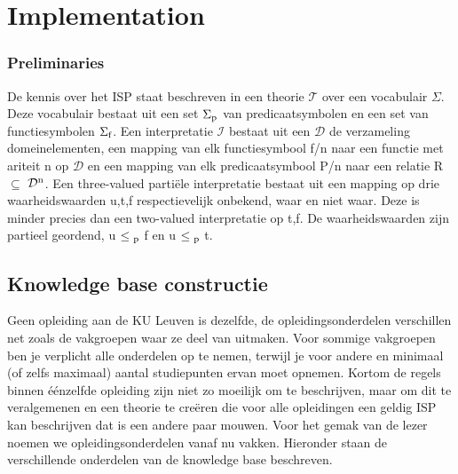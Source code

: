 \chapter{Implementation}
\label{cha:implementation}

\subsection{Preliminaries}
De kennis over het ISP staat beschreven in een theorie $\mathcal{T}$ over een vocabulair $\Sigma$. Deze vocabulair bestaat uit een set $\Sigma\textsubscript{p}$ van predicaatsymbolen en een set van functiesymbolen $\Sigma\textsubscript{f}$. Een interpretatie $\mathcal{I}$ bestaat uit een $\mathcal{D}$ de verzameling domeinelementen, een mapping van elk functiesymbool f/n naar een functie met ariteit n op $\mathcal{D}$ en een mapping van elk predicaatsymbool P/n naar een relatie R $\subseteq$ $\mathcal{D}\textsuperscript{n}$. Een three-valued parti\"{e}le interpretatie bestaat uit een mapping op drie waarheidswaarden {u,t,f} respectievelijk onbekend, waar en niet waar. Deze is minder precies dan een two-valued interpretatie op {t,f}. 
De waarheidswaarden zijn partieel geordend, u $\leq\textsubscript{p}$ f en u $\leq\textsubscript{p}$ t.

\section{Knowledge base constructie}
Geen opleiding aan de KU Leuven is dezelfde, de opleidingsonderdelen verschillen net zoals de vakgroepen waar ze deel van uitmaken. Voor sommige vakgroepen ben je verplicht alle onderdelen op te nemen, terwijl je voor andere en minimaal (of zelfs maximaal) aantal studiepunten ervan moet opnemen. Kortom de regels binnen \'{e}\'{e}nzelfde opleiding zijn niet zo moeilijk om te beschrijven, maar om dit te veralgemenen en een theorie te cre\"{e}ren die voor alle opleidingen een geldig ISP kan beschrijven dat is een andere paar mouwen. Voor het gemak van de lezer noemen we opleidingsonderdelen vanaf nu vakken. Hieronder staan de verschillende onderdelen van de knowledge base beschreven.

